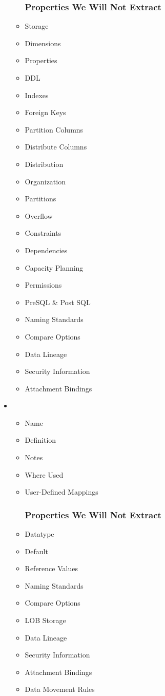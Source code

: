 \documentclass[12pt,a4paper]{report}
\begin{document}
\begin{itemize}
\begin{itemize}
		\subsubsection{Properties We Will Not Extract}
		\item Storage
		\item Dimensions
		\item Properties
		\item DDL
		\item Indexes
		\item Foreign Keys
		\item Partition Columns
		\item Distribute Columns
		\item Distribution
		\item Organization
		\item Partitions
		\item Overflow
		\item Constraints
		\item Dependencies
		\item Capacity Planning
		\item Permissions
		\item PreSQL \& Post SQL
		\item Naming Standards
		\item Compare Options
		\item Data Lineage
		\item Security Information
		\item Attachment Bindings
	\end{itemize}
	\item {}
	\begin{itemize}
		\item Name
		\item Definition
		\item Notes
		\item Where Used
		\item User-Defined Mappings
		\subsubsection{Properties We Will Not Extract}
		\item Datatype
		\item Default
		\item Reference Values
		\item Naming Standards
		\item Compare Options
		\item LOB Storage
		\item Data Lineage
		\item Security Information
		\item Attachment Bindings
		\item Data Movement Rules
	\end{itemize}

\end{itemize}
\end{document}
